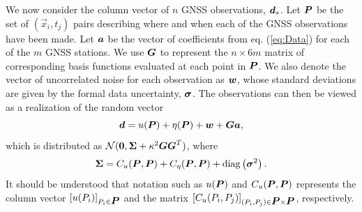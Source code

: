 \documentclass[extra,mreferee]{gji}
\begin{document}
We now consider the column vector of $n$ GNSS observations, $\mitbf{d}_*$. Let $\mitbf{P}$ be the set of $(\vec{x}_i, t_j)$ pairs describing where and when each of the GNSS observations have been made. Let $\mitbf{a}$ be the vector of coefficients from eq. (\ref{eq:Data}) for each of the $m$ GNSS stations. We use $\mitbf{G}$ to represent the $n \times 6m$ matrix of corresponding basis functions evaluated at each point in $\mitbf{P}$. We  also denote the vector of uncorrelated noise for each observation as $\mitbf{w}$, whose standard deviations are given by the formal data uncertainty, $\mitbf{\sigma}$. The observations can then be viewed as a realization of the random vector
\begin{equation}
\mitbf{d} = u(\mitbf{P}) + \eta(\mitbf{P}) + \mitbf{w} + \mitbf{G}\mitbf{a},
\end{equation}
which is distributed as $\mathcal{N}(\mitbf{0},\mitbf{\Sigma} + \kappa^2\mitbf{G}\mitbf{G}^T)$, where
\begin{equation}\label{eq:Cd}
\mitbf{\Sigma} = C_u(\mitbf{P},\mitbf{P}) + C_\eta(\mitbf{P},\mitbf{P}) + 
              \mathrm{diag}\left(\mitbf{\sigma}^2\right).  
\end{equation}
It should be understood that notation such as $u(\mitbf{P})$ and $C_u(\mitbf{P},\mitbf{P})$ represents the column vector $[u(P_i)]_{P_i \in \mitbf{P}}$ and the matrix $[C_u(P_i,P_j)]_{(P_i,P_j) \in \mitbf{P} \times \mitbf{P}}$, respectively. 
\end{document}
